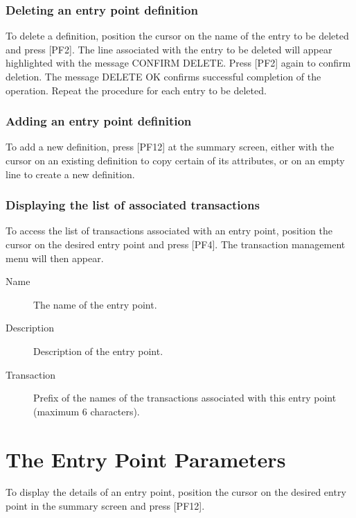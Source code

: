 \documentclass[letterpaper,10pt,english]{sphinxmanual}
\begin{document}
\subsubsection{Deleting an entry point definition}
\label{\detokenize{connectivity_guide:deleting-an-entry-point-definition}}
To delete a definition, position the cursor on the name of the entry to be deleted and press {[}PF2{]}. The line associated with the entry to be deleted will appear highlighted with the message CONFIRM DELETE. Press {[}PF2{]} again to confirm deletion. The message DELETE OK confirms successful completion of the operation. Repeat the procedure for each entry to be deleted.


\subsubsection{Adding an entry point definition}
\label{\detokenize{connectivity_guide:adding-an-entry-point-definition}}
To add a new definition, press {[}PF12{]} at the summary screen, either with the cursor on an existing definition to copy certain of its attributes, or on an empty line to create a new definition.


\subsubsection{Displaying the list of associated transactions}
\label{\detokenize{connectivity_guide:displaying-the-list-of-associated-transactions}}
To access the list of transactions associated with an entry point, position the cursor on the desired entry point and press {[}PF4{]}. The transaction management menu will then appear.

\begin{description}
\item[{Name}] \leavevmode
The name of the entry point.

\item[{Description}] \leavevmode
Description of the entry point.

\item[{Transaction}] \leavevmode
Prefix of the names of the transactions associated with this entry point (maximum 6 characters).

\end{description}


\section{The Entry Point Parameters}
\label{\detokenize{connectivity_guide:the-entry-point-parameters}}
To display the details of an entry point, position the cursor on the desired entry point in the summary screen and press {[}PF12{]}.
\end{document}
